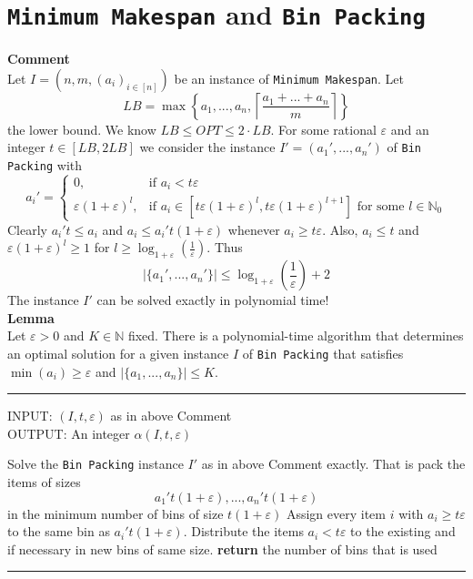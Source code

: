 \documentclass[a4paper, 12pt]{article}
\begin{document}
	\section{\texttt{Minimum Makespan} and \texttt{Bin Packing}}
	\textbf{Comment}\\
	Let $I = (n,m,(a_i)_{i \in [n]})$ be an instance of \texttt{Minimum Makespan}. Let \[LB = \max\left\{a_1,...,a_n, \left\lceil\frac{a_1+...+a_n}{m} \right\rceil\right\}\] the lower bound. We know $LB \leq OPT \leq 2\cdot LB$. For some rational $\varepsilon$ and an integer $t \in [LB, 2LB]$ we consider the instance $I' = (a_1',...,a_n')$ of \texttt{Bin Packing} with \[a_i' = \begin{cases}
		0, & \text{if } a_i < t\varepsilon\\
		\varepsilon(1+\varepsilon)^l, & \text{if } a_i \in [t\varepsilon(1+\varepsilon)^l, t\varepsilon(1+\varepsilon)^{l+1}] \text{ for some } l \in \mathbb{N}_0
	\end{cases}\]
	Clearly $a_i't \leq a_i$ and $a_i \leq a_i't(1+\varepsilon)$ whenever $a_i \geq t \varepsilon$. Also, $a_i \leq t$ and $\varepsilon(1+\varepsilon)^l \geq 1$ for $l \geq \log_{1+\varepsilon}(\frac{1}{\varepsilon})$. Thus \[\left|\{a_1',...,a_n'\}\right| \leq \log_{1+\varepsilon}(\frac{1}{\varepsilon})+2\]
	The instance $I'$ can be solved exactly in polynomial time!\\
	\textbf{Lemma}\\
	Let $\varepsilon >0$ and $K \in \mathbb{N}$ fixed. There is a polynomial-time algorithm that determines an optimal solution for a given instance $I$ of \texttt{Bin Packing} that satisfies $\min(a_i) \geq \varepsilon$ and $\left|\{a_1,...,a_n\}\right|\leq K$.
	\par\noindent\rule{\textwidth}{0.4pt}
	INPUT: $(I,t,\varepsilon)$ as in above Comment\\
	OUTPUT: An integer $\alpha(I,t,\varepsilon)$
	\begin{algorithmic}[1]
		\State Solve the \texttt{Bin Packing} instance $I'$ as in above Comment exactly. That is pack the items of sizes \[a_1't(1+\varepsilon),...,a_n't(1+\varepsilon)\]
		in the minimum number of bins of size $t(1+\varepsilon)$
		\State Assign every item $i$ with $a_i \geq t\varepsilon$ to the same bin as $a_i't(1+\varepsilon)$. Distribute the items $a_i < t\varepsilon$ to the existing and if necessary in new bins of same size.
		\State \textbf{return} the number of bins that is used
	\end{algorithmic}
	\par\noindent\rule{\textwidth}{0.4pt}\\
\end{document}
